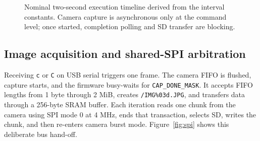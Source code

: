 \documentclass[11pt,a4paper]{article}
\newcommand{\code}[1]{\texttt{#1}}
\begin{document}
\begin{figure}[H]
\centering
{}
\caption{Nominal two-second execution timeline derived from the interval constants. Camera capture is asynchronous only at the command level; once started, completion polling and SD transfer are blocking.}
\label{fig:timing}
\end{figure}

\subsection{Image acquisition and shared-SPI arbitration}

Receiving \code{c} or \code{C} on USB serial triggers one frame. The camera FIFO is flushed, capture starts, and the firmware busy-waits for \code{CAP\_DONE\_MASK}. It accepts FIFO lengths from 1 byte through 2 MiB, creates \code{/IMG\%03d.JPG}, and transfers data through a 256-byte SRAM buffer. Each iteration reads one chunk from the camera using SPI mode 0 at 4 MHz, ends that transaction, selects SD, writes the chunk, and then re-enters camera burst mode. Figure~\ref{fig:spi} shows this deliberate bus hand-off.
\end{document}
